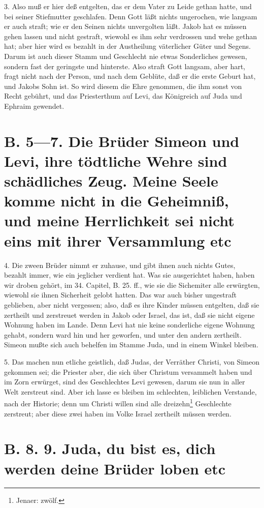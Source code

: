 3. Also muß er hier deß entgelten, das er dem Vater zu Leide gethan hatte, und bei seiner Stiefmutter geschlafen. Denn Gott läßt nichts ungerochen, wie langsam er auch straft; wie er den Seinen nichts unvergolten läßt. Jakob hat es müssen gehen lassen und nicht gestraft, wiewohl es ihm sehr verdrossen und wehe gethan hat; aber hier wird es bezahlt in der Austheilung väterlicher Güter und Segens. Darum ist auch dieser Stamm und Geschlecht nie etwas Sonderliches gewesen, sondern fast der geringste und hinterste. Also straft Gott langsam, aber hart, fragt nicht nach der Person, und nach dem Geblüte, daß er die erste Geburt hat, und Jakobs Sohn ist. So wird diesem die Ehre genommen, die ihm sonst von Recht gebührt, und das Priesterthum auf Levi, das Königreich auf Juda und Ephraim gewendet.

\section[B. 5—7. Die Brüder Simeon und Levi, ihre]{B. 5—7. Die Brüder Simeon und Levi, ihre tödtliche Wehre sind schädliches Zeug. Meine Seele komme nicht in die Geheimniß, und meine Herrlichkeit sei nicht eins mit ihrer Versammlung etc}

4. Die zween Brüder nimmt er zuhause, und gibt ihnen auch nichts Gutes, bezahlt immer, wie ein jeglicher verdient hat. Was sie ausgerichtet haben, haben wir droben gehört, im 34. Capitel, B. 25. ff., wie sie die Sichemiter alle erwürgten, wiewohl sie ihnen Sicherheit gelobt hatten. Das war auch bisher ungestraft geblieben, aber nicht vergessen; also, daß es ihre Kinder müssen entgelten, daß sie zertheilt und zerstreuet werden in Jakob oder Israel, das ist, daß sie nicht eigene Wohnung haben im Lande. Denn Levi hat nie keine sonderliche eigene Wohnung gehabt, sondern ward hin und her geworfen, und unter den andern zertheilt. Simeon mußte sich auch behelfen im Stamme Juda, und in einem Winkel bleiben.

5. Das machen nun etliche geistlich, daß Judas, der Verräther Christi, von Simeon gekommen sei; die Priester aber, die sich über Christum versammelt haben und im Zorn erwürget, sind des Geschlechtes Levi gewesen, darum sie nun in aller Welt zerstreut sind. Aber ich lasse es bleiben im schlechten, leiblichen Verstande, nach der Historie; denn um Christi willen sind alle dreizehn\footnote{Jenaer: zwölf.} Geschlechte zerstreut; aber diese zwei haben im Volke Israel zertheilt müssen werden.

\section[B. 8. 9. Juda, du bist es, dich]{B. 8. 9. Juda, du bist es, dich werden deine Brüder loben etc}

